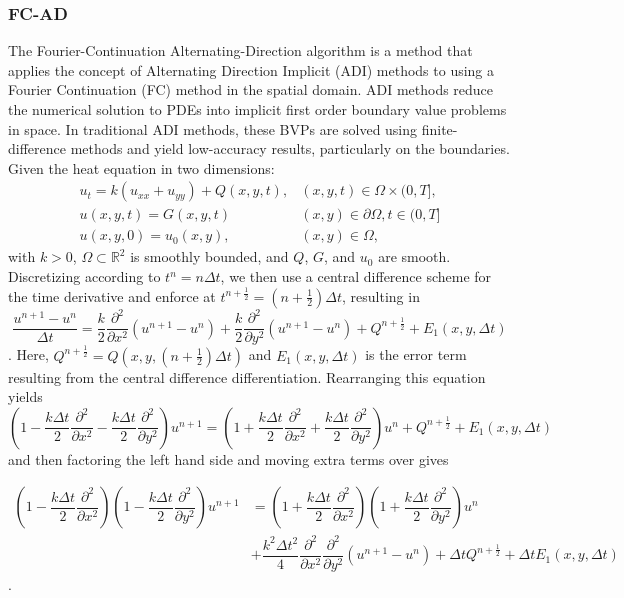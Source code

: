 \documentclass[11pt]{amsart}
\begin{document}
\subsubsection{FC-AD}
The Fourier-Continuation Alternating-Direction algorithm is a method that applies the concept of Alternating Direction Implicit (ADI) methods to using a Fourier Continuation (FC) method in the spatial domain.  ADI methods reduce the numerical solution to PDEs into implicit first order boundary value problems in space.  In traditional ADI methods, these  BVPs are solved using finite-difference methods and yield low-accuracy results, particularly on the boundaries.  \\
Given the heat equation in two dimensions:
\begin{eqnarray}
u_t=k(u_{xx}+u_{yy}) + Q(x,y,t), & (x,y,t) \in \Omega \times (0,T], \nonumber \\
u(x,y,t) = G(x,y,t) & (x,y) \in \partial \Omega, t \in (0,T] \\
u(x,y,0)=u_0(x,y), & (x,y) \in \Omega, \nonumber 
\end{eqnarray}
with $k>0$, $\Omega \subset \mathbb{R}^2$ is smoothly bounded, and $Q$, $G$, and $u_0$ are smooth.  Discretizing according to $t^n=n\Delta t$, we then use a central difference scheme for the time derivative and enforce at $t^{n+\frac{1}{2}}=(n+\frac{1}{2})\Delta t$, resulting in
\begin{equation}
\dfrac{u^{n+1}-u^n}{\Delta t} = \dfrac{k}{2}\dfrac{\partial^2}{\partial x^2}(u^{n+1}-u^n) +\dfrac{k}{2}\dfrac{\partial^2}{\partial y^2}(u^{n+1}-u^n) + Q^{n+\frac{1}{2}} + E_1(x,y,\Delta t)
\end{equation}.
Here, $Q^{n+\frac{1}{2}}= Q(x,y,(n+\frac{1}{2})\Delta t)$ and $E_1(x,y,\Delta t)$ is the error term resulting from the central difference differentiation.  
Rearranging this equation yields
\begin{equation}
\left(1-\dfrac{k\Delta t}{2}\dfrac{\partial ^2 }{\partial x ^2 } - \dfrac{k\Delta t}{2}\dfrac{\partial ^2 }{\partial y ^2 }\right)u^{n+1}= \left(1+\dfrac{k\Delta t}{2}\dfrac{\partial ^2 }{\partial x ^2 } + \dfrac{k\Delta t}{2}\dfrac{\partial ^2 }{\partial y ^2 }\right)u^n + Q^{n+\frac{1}{2}}+E_1(x,y,\Delta t)
\end{equation}
and then factoring the left hand side and moving extra terms over gives 

\begin{equation}
\begin{aligned}
\left(1-\dfrac{k\Delta t}{2}\dfrac{\partial ^2}{\partial x^2} \right) \left(1-\dfrac{k\Delta t}{2}\dfrac{\partial ^2}{\partial y^2} \right)u^{n+1}& =  
\left(1+\dfrac{k\Delta t}{2}\dfrac{\partial ^2}{\partial x^2} \right) \left(1+\dfrac{k\Delta t}{2}\dfrac{\partial ^2}{\partial y^2} \right)u^n\\ &+ \dfrac{k^2 \Delta t^2}{4}\dfrac{\partial ^ 2}{\partial x^2}\dfrac{\partial ^2}{\partial y ^ 2} (u^{n+1}-u^n) + \Delta t Q^{n + \frac{1}{2}} + \Delta t E_1(x,y,\Delta t)
\end{aligned}
\end{equation}.
\end{document}
